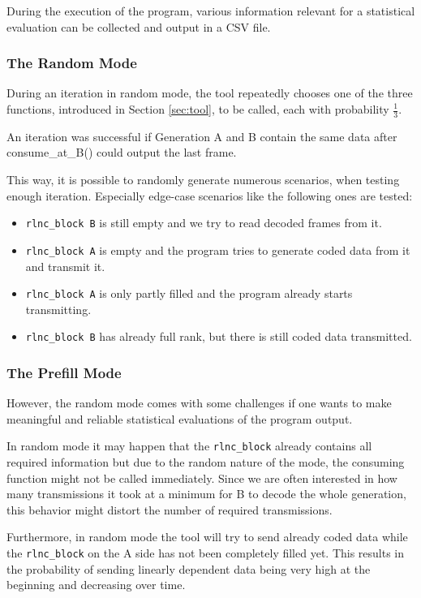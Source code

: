 \documentclass[a4paper,english,10pt]{tumarticle}
\begin{document}
During the execution of the program, various information relevant for a statistical evaluation can be collected and output in a CSV file.

\subsubsection{The Random Mode}\label{sec:random}
During an iteration in random mode, the tool repeatedly chooses one of the three functions, introduced in Section \ref{sec:tool}, 
to be called, each with probability $\frac{1}{3}$. 

An iteration was successful if Generation A and B contain the same data after consume\_at\_B() could output the last frame.

This way, it is possible to randomly generate numerous scenarios, when testing enough iteration. 
Especially edge-case scenarios like the following ones are tested:

\begin{itemize}
  \item \texttt{rlnc\_block B} is still empty and we try to read decoded frames from it.
  \item \texttt{rlnc\_block A} is empty and the program tries to generate coded data from it and transmit it.
  \item \texttt{rlnc\_block A} is only partly filled and the program already starts transmitting.
  \item \texttt{rlnc\_block B} has already full rank, but there is still coded data transmitted.
\end{itemize}

\subsubsection{The Prefill Mode}\label{sec:prefill}
However, the random mode comes with some challenges if one wants to make meaningful and reliable statistical 
evaluations of the program output.

In random mode it may happen that the \texttt{rlnc\_block} already contains all required information but due
to the random nature of the mode, the consuming function might not be called immediately.
Since we are often interested in how many transmissions it took at a minimum for B to decode the whole generation, this behavior 
might distort the number of required transmissions.

Furthermore, in random mode the tool will try to send already coded data while the \texttt{rlnc\_block} on the A side has not been completely filled yet. 
This results in the probability of sending linearly dependent data being very high at the beginning and decreasing over time. 
\end{document}
